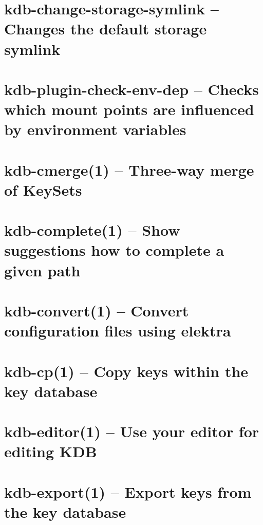 \let\mypdfximage\pdfximage\def\pdfximage{\immediate\mypdfximage}\documentclass[twoside]{book}
\newcommand{\+}{\discretionary{\mbox{\scriptsize$\hookleftarrow$}}{}{}}
\begin{document}
\chapter{kdb-\/change-\/storage-\/symlink -- Changes the default storage symlink}
\label{doc_help_kdb-change-storage-symlink_md}

\chapter{kdb-\/plugin-\/check-\/env-\/dep -- Checks which mount points are influenced by environment variables}
\label{doc_help_kdb-check-env-dep_md}

\chapter{kdb-\/cmerge(1) -- Three-\/way merge of Key\+Sets}
\label{doc_help_kdb-cmerge_md}

\chapter{kdb-\/complete(1) -- Show suggestions how to complete a given path}
\label{doc_help_kdb-complete_md}

\chapter{kdb-\/convert(1) -- Convert configuration files using elektra}
\label{doc_help_kdb-convert_md}

\chapter{kdb-\/cp(1) -- Copy keys within the key database}
\label{doc_help_kdb-cp_md}

\chapter{kdb-\/editor(1) -- Use your editor for editing K\+DB}
\label{doc_help_kdb-editor_md}

\chapter{kdb-\/export(1) -- Export keys from the key database}
\label{doc_help_kdb-export_md}

\end{document}
